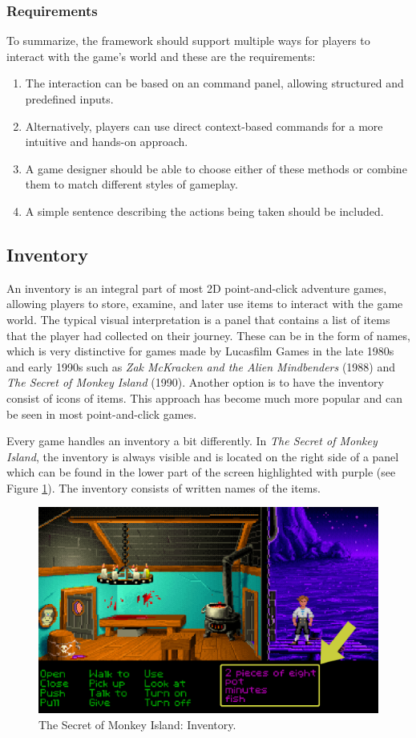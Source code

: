 \subsubsection{Requirements}
To summarize, the framework should support multiple ways for players to interact with the game's world and these are the requirements:

\begin{enumerate}[label=\color{teal}\textbf{R{\arabic*}}]
  \item \label{intro:req:com_pan} The interaction can be based on an command panel, allowing structured and predefined inputs.
  \item \label{intro:req:mouse} Alternatively, players can use direct context-based commands for a more intuitive and hands-on approach.
  \item \label{intro:req:mix} A game designer should be able to choose either of these methods or combine them to match different styles of gameplay.
  \item \label{intro:req:sentence} A simple sentence describing the actions being taken should be included.
\end{enumerate}

\subsection{Inventory}
\label{sec:Inventory}
An inventory is an integral part of most 2D point-and-click adventure games, allowing players to store, examine, and later use items to interact with the game world. The typical visual interpretation is a panel that contains a list of items that the player had collected on their journey. These can be in the form of names, which is very distinctive for games made by Lucasfilm Games in the late 1980s and early 1990s such as \textit{Zak McKracken and the Alien Mindbenders} (1988) and \textit{The Secret of Monkey Island} (1990). Another option is to have the inventory consist of icons of items. This approach has become much more popular and can be seen in most point-and-click games.

Every game handles an inventory a bit differently. In \textit{The Secret of Monkey Island}, the inventory is always visible and is located on the right side of a panel which can be found in the lower part of the screen highlighted with purple (see Figure \ref{fig:I-TSoMI}). The inventory consists of written names of the items. 

\begin{figure}[H]
\centering
\includegraphics[width=.7\linewidth]{img/I-TSoMI.png}
\caption{The Secret of Monkey Island: Inventory.}
\label{fig:I-TSoMI}
\end{figure}

